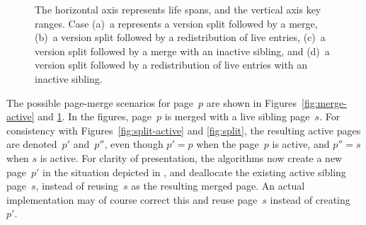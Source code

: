 \begin{figure}[!htb]
\begin{center}
  {The horizontal axis represents life spans, and the vertical
  axis key ranges.
  Case
  (a)~a represents a version split followed by a merge,
  (b)~a version split followed by a redistribution of live entries,
  (c)~a version split followed by a merge with an inactive
  sibling, and
  (d)~a version split followed by a redistribution of live entries
  with an inactive sibling.}
  \label{fig:merge-inactive}
\end{center}
\end{figure}

The possible page-merge scenarios for page~$p$ are shown
in Figures~\ref{fig:merge-active} and \ref{fig:merge-inactive}. 
In the figures, page~$p$ is merged with a live sibling page~$s$. 
For consistency with Figures~\ref{fig:split-active} and \ref{fig:split}, the
resulting active pages are denoted~$p'$ and~$p''$, even though $p' = p$ when
the page~$p$ is active, and $p'' = s$ when $s$ is active.
For clarity of presentation, the algorithms now create a new page~$p'$ in the
situation depicted in , and deallocate the existing
active sibling page~$s$, instead of reusing~$s$ as the resulting merged page. 
An actual implementation may of course correct this and reuse page~$s$
instead of creating~$p'$.

